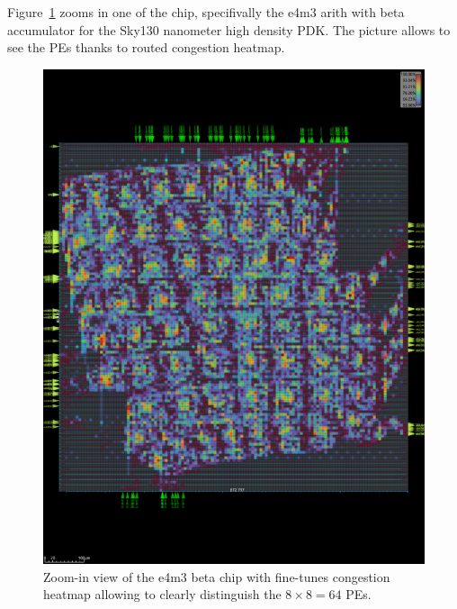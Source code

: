 Figure~\ref{fig:focus_on_e4m3} zooms in one of the chip, specifivally the e4m3 arith with beta accumulator for the Sky130 nanometer high density PDK.
The picture allows to see the PEs thanks to routed congestion heatmap.

\begin{figure}[t]
\centering
	\includegraphics[width=0.45\columnwidth]{./figures/SA_8x8_e4m3_rulers_congestion2.png}
	\caption{Zoom-in view of the e4m3 beta chip with fine-tunes congestion heatmap allowing to clearly distinguish the $8\times8=64$ PEs.}
	\vspace{-0.5cm}
	\label{fig:focus_on_e4m3}
\end{figure}
